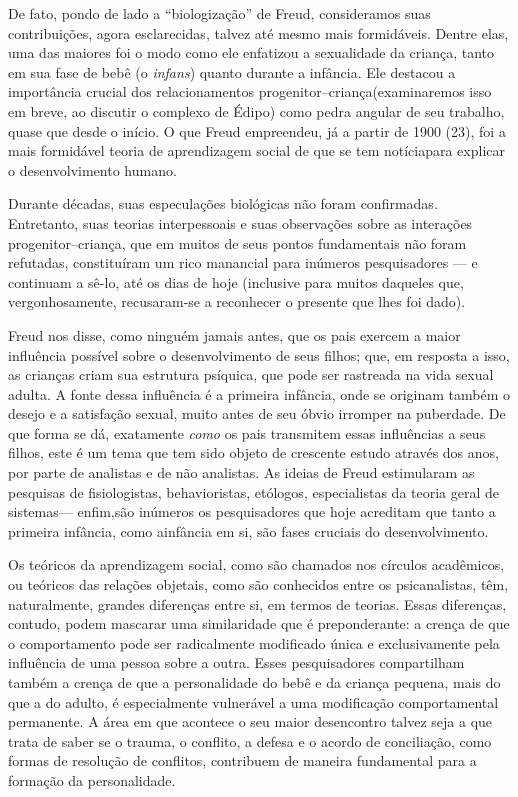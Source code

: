  De fato, pondo de lado a ``biologização'' de
Freud, consideramos suas contribuições, agora esclarecidas, talvez até
mesmo mais formidáveis. Dentre elas, uma das maiores foi o modo como
ele enfatizou a sexualidade da criança, tanto em sua fase de bebê
(o \textit{infans}) quanto durante a infância. Ele destacou a
importância crucial dos relacionamentos progenitor--criança\idxrelpc[|(]
(examinaremos isso em breve, ao discutir o complexo de Édipo) como
pedra angular de seu trabalho, quase que desde o início. O que Freud
empreendeu, já a partir de 1900 (23), foi a mais formidável teoria de
aprendizagem social de que se tem notícia\idxbisse[|)] para explicar o
desenvolvimento humano.

 Durante décadas, suas especulações biológicas não foram confirmadas.
Entretanto, suas teorias interpessoais\idxfreudinter{} e suas observações sobre as
interações progenitor--criança, que em muitos de seus pontos
fundamentais não foram refutadas, constituíram um rico manancial para
inúmeros pesquisadores --- e continuam a sê-lo, até os dias de hoje
(inclusive para muitos daqueles que, vergonhosamente, recusaram-se a
reconhecer o presente que lhes foi dado).

 Freud nos disse, como ninguém jamais antes, que os pais exercem a maior
influência possível sobre o desenvolvimento de seus filhos; que, em
resposta a isso, as crianças criam sua estrutura psíquica, que pode ser
rastreada na vida sexual adulta. A fonte dessa influência é a primeira
infância, onde se originam também o desejo e a satisfação sexual,
muito antes de seu óbvio irromper na puberdade. De que forma se dá,
exatamente \textit{como} os pais transmitem essas influências a seus
filhos, este é um tema que tem sido objeto de crescente estudo através
dos anos, por parte de analistas e de não analistas. As ideias de Freud
estimularam as pesquisas de fisiologistas, behavioristas, etólogos,
especialistas da teoria geral de sistemas\idxbisseteor[|)] --- enfim,\idxfreud[|)] são inúmeros os
pesquisadores que hoje acreditam que tanto a primeira infância, como a\idxrelpc[|)]
infância em si, são fases cruciais do desenvolvimento.

 Os teóricos da aprendizagem social, como são chamados nos círculos
acadêmicos, ou teóricos das relações objetais, como são conhecidos
entre os psicanalistas, têm, naturalmente, grandes diferenças entre si,
em termos de teorias. Essas diferenças, contudo, podem mascarar uma
similaridade que é preponderante: a crença de que o comportamento pode
ser radicalmente modificado única e exclusivamente pela influência de
uma pessoa sobre a outra. Esses pesquisadores compartilham também a
crença de que a personalidade do bebê e da criança pequena, mais do que
a do adulto, é especialmente vulnerável a uma modificação
comportamental permanente. A área em que acontece o seu maior
desencontro talvez seja a que trata de saber se o trauma,\idxtrauma{} o conflito, a
defesa e o acordo de conciliação, como formas de resolução de
conflitos, contribuem de maneira fundamental para a formação da
personalidade.


